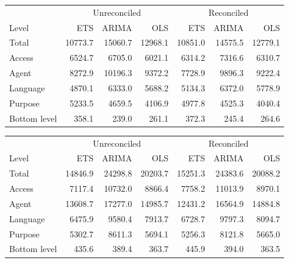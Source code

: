 \documentclass[11pt,a4paper,]{article}
\let\origtable\table
\let\endorigtable\endtable
\renewenvironment{table}[1][2] {
    \expandafter\origtable\expandafter[!htbp]
} {
    \endorigtable
}
\begin{document}
\begin{table}[!h]

\caption{\label{tab:wikipediadataresulrolling}Mean(RMSE) for ETS, ARIMA and OLS with and without reconciliation - Rolling origin - Wikipedia dataset}
\centering
\begin{tabular}[t]{lrrrrrr}
\toprule
\multicolumn{1}{c}{} & \multicolumn{3}{c}{Unreconciled} & \multicolumn{3}{c}{Reconciled} \\
\cmidrule(l{3pt}r{3pt}){2-4} \cmidrule(l{3pt}r{3pt}){5-7}
Level & ETS & ARIMA & OLS & ETS & ARIMA & OLS\\
\midrule
Total & 10773.7 & 15060.7 & 12968.1 & 10851.0 & 14575.5 & 12779.1\\
Access & 6524.7 & 6705.0 & 6021.1 & 6314.2 & 7316.6 & 6310.7\\
Agent & 8272.9 & 10196.3 & 9372.2 & 7728.9 & 9896.3 & 9222.4\\
Language & 4870.1 & 6333.0 & 5688.2 & 5134.3 & 6372.0 & 5778.9\\
Purpose & 5233.5 & 4659.5 & 4106.9 & 4977.8 & 4525.3 & 4040.4\\
Bottom level & 358.1 & 239.0 & 261.1 & 372.3 & 245.4 & 264.6\\
\bottomrule
\end{tabular}
\end{table}

\begin{table}

\caption{\label{tab:wikipediadataresultRMSE}Mean(RMSE) for ETS, ARIMA and OLS with and without reconciliation - Fixed origin - Wikipedia dataset}
\centering
\begin{tabular}[t]{lrrrrrr}
\toprule
\multicolumn{1}{c}{} & \multicolumn{3}{c}{Unreconciled} & \multicolumn{3}{c}{Reconciled} \\
\cmidrule(l{3pt}r{3pt}){2-4} \cmidrule(l{3pt}r{3pt}){5-7}
Level & ETS & ARIMA & OLS & ETS & ARIMA & OLS\\
\midrule
Total & 14846.9 & 24298.8 & 20203.7 & 15251.3 & 24383.6 & 20088.2\\
Access & 7117.4 & 10732.0 & 8866.4 & 7758.2 & 11013.9 & 8970.1\\
Agent & 13608.7 & 17277.0 & 14985.7 & 12431.2 & 16564.9 & 14884.8\\
Language & 6475.9 & 9580.4 & 7913.7 & 6728.7 & 9797.3 & 8094.7\\
Purpose & 5302.7 & 8611.3 & 5694.1 & 5256.3 & 8121.8 & 5665.0\\
Bottom level & 435.6 & 389.4 & 363.7 & 445.9 & 394.0 & 363.5\\
\bottomrule
\end{tabular}
\end{table}
\end{document}
